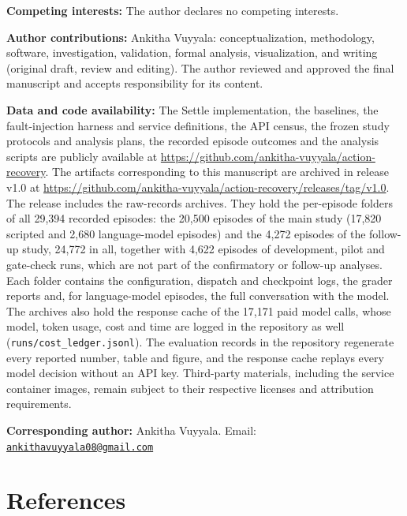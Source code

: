 \documentclass[
  10pt,
]{article}
\begin{document}
\textbf{Competing interests:} The author declares no competing
interests.

\textbf{Author contributions:} Ankitha Vuyyala: conceptualization,
methodology, software, investigation, validation, formal analysis,
visualization, and writing (original draft, review and editing). The
author reviewed and approved the final manuscript and accepts
responsibility for its content.

\textbf{Data and code availability:} The Settle implementation, the
baselines, the fault-injection harness and service definitions, the API
census, the frozen study protocols and analysis plans, the recorded
episode outcomes and the analysis scripts are publicly available at
\url{https://github.com/ankitha-vuyyala/action-recovery}. The artifacts
corresponding to this manuscript are archived in release v1.0 at
\url{https://github.com/ankitha-vuyyala/action-recovery/releases/tag/v1.0}.
The release includes the raw-records archives. They hold the per-episode
folders of all 29,394 recorded episodes: the 20,500 episodes of the main
study (17,820 scripted and 2,680 language-model episodes) and the 4,272
episodes of the follow-up study, 24,772 in all, together with 4,622
episodes of development, pilot and gate-check runs, which are not part
of the confirmatory or follow-up analyses. Each folder contains the
configuration, dispatch and checkpoint logs, the grader reports and, for
language-model episodes, the full conversation with the model. The
archives also hold the response cache of the 17,171 paid model calls,
whose model, token usage, cost and time are logged in the repository as
well (\texttt{runs/cost\_ledger.jsonl}). The evaluation records in the
repository regenerate every reported number, table and figure, and the
response cache replays every model decision without an API key.
Third-party materials, including the service container images, remain
subject to their respective licenses and attribution requirements.

\textbf{Corresponding author:} Ankitha Vuyyala. Email:
\href{mailto:ankithavuyyala08@gmail.com}{\nolinkurl{ankithavuyyala08@gmail.com}}

\hypertarget{references}{%
\section*{References}\label{references}}

\begingroup\small\linespread{1.08}\selectfont\setlength{\parskip}{3pt}
\end{document}
